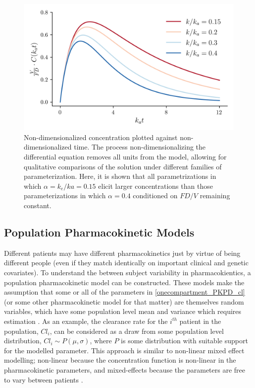 \begin{figure}[h!]
	\centering
	\includegraphics{figures/pkcurves.png}
	\caption[Non-dimensionalized solutions to pharmacokinetic differential equation] {Non-dimensionalized concentration plotted against non-dimensionalized time.  The process non-dimensionalizing the differential equation removes all units from the model, allowing for qualitative comparisons of the solution under different families of parameterization.  Here, it is shown that all parametrizations in which $\alpha = k_e/ka = 0.15$ elicit larger concentrations than those parameterizations in which $\alpha=0.4$ conditioned on $FD/V$ remaining constant.}
	\label{fig:pkcureves}
\end{figure}

\subsection{Population Pharmacokinetic Models}


Different patients may have different pharmacokinetics just by virtue of being different people (even if they match identically on important clinical and genetic covariates).  To understand the between subject variability in pharmacokientics, a population pharmacokinetic model can be constructed.  These models make the assumption that some or all of the parameters in \cref{onecompartment_PKPD_cl} (or some other pharmacokinetic model for that matter) are themselves random variables, which have some population level mean and variance which requires estimation \cite{owen2014introduction}.  As an example, the clearance rate for the $i^{th}$ patient in the population, $Cl_i$, can be considered as a draw from some population level distribution, $Cl_i \sim P(\mu, \sigma) $, where $P$ is some distribution with suitable support for the modelled parameter.  This approach is similar to non-linear mixed effect modelling; non-linear because the concentration function is non-linear in the pharmacokinetic parameters, and mixed-effects because the parameters are free to vary between patients \cite{owen2014introduction, mould2013basic}.

